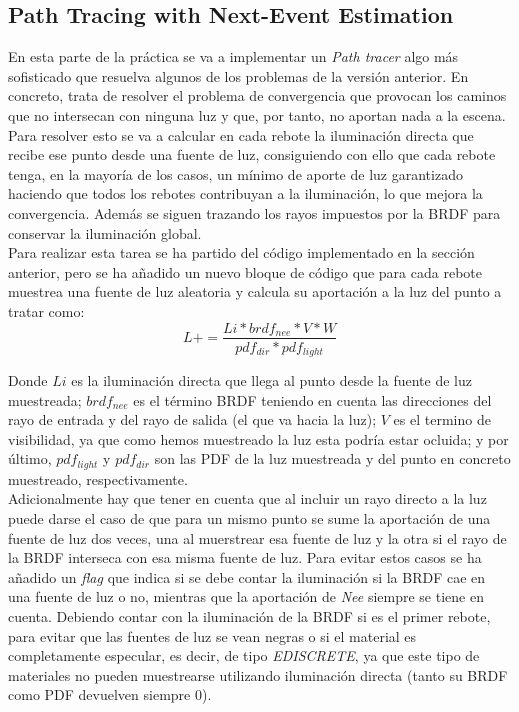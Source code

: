 \documentclass[10pt,oneside,a4paper]{article}
\begin{document}
\subsection{Path Tracing with Next-Event Estimation}
En esta parte de la práctica se va a implementar un \textit{Path tracer} algo más sofisticado que resuelva algunos de los problemas de la versión anterior. En concreto, trata de resolver el problema de convergencia que provocan los caminos que no intersecan con ninguna luz y que, por tanto, no aportan nada a la escena. Para resolver esto se va a calcular en cada rebote la iluminación directa que recibe ese punto desde una fuente de luz, consiguiendo con ello que cada rebote tenga, en la mayoría de los casos, un mínimo de aporte de luz garantizado haciendo que todos los rebotes contribuyan a la iluminación, lo que mejora la convergencia. Además se siguen trazando los rayos impuestos por la BRDF para conservar la iluminación global.\\

Para realizar esta tarea se ha partido del código implementado en la sección anterior, pero se ha añadido un nuevo bloque de código que para cada rebote muestrea una fuente de luz aleatoria y calcula su aportación a la luz del punto a tratar como:
$$ L += \frac{Li * brdf_{nee} * V * W}{pdf_{dir} * pdf_{light}}$$

Donde $Li$ es la iluminación directa que llega al punto desde la fuente de luz muestreada; $brdf_{nee}$ es el término BRDF teniendo en cuenta las direcciones del rayo de entrada y del rayo de salida (el que va hacia la luz); $V$ es el termino de visibilidad, ya que como hemos muestreado la luz esta podría estar ocluida; y por último, $pdf_{light}$ y $pdf_{dir}$ son las PDF de la luz muestreada y del punto en concreto muestreado, respectivamente. \\

Adicionalmente hay que tener en cuenta que al incluir un rayo directo a la luz puede darse el caso de que para un mismo punto se sume la aportación de una fuente de luz dos veces, una al muerstrear esa fuente de luz y la otra si el rayo de la BRDF interseca con esa misma fuente de luz. Para evitar estos casos se ha añadido un \textit{flag} que indica si se debe contar la iluminación si la BRDF cae en una fuente de luz o no, mientras que la aportación de \textit{Nee} siempre se tiene en cuenta. Debiendo contar con la iluminación de la BRDF si es el primer rebote, para evitar que las fuentes de luz se vean negras o si el material es completamente especular, es decir, de tipo \textit{EDISCRETE}, ya que este tipo de materiales no pueden muestrearse utilizando iluminación directa (tanto su BRDF como PDF devuelven siempre 0).\\
\end{document}
